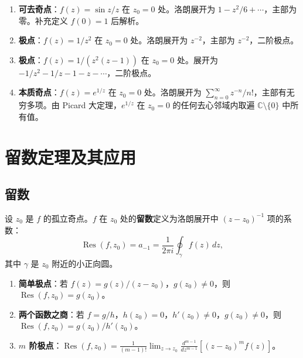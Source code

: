 \begin{example}[三类孤立奇点的实例]\label{ex:ca_singularity_examples}
\begin{enumerate}[label=(\roman*)]
    \item \textbf{可去奇点}：$f(z) = \sin z / z$ 在 $z_0 = 0$ 处。洛朗展开为 $1 - z^2/6 + \cdots$，主部为零。补充定义 $f(0) = 1$ 后解析。
    \item \textbf{极点}：$f(z) = 1/z^2$ 在 $z_0 = 0$ 处。洛朗展开为 $z^{-2}$，主部为 $z^{-2}$，二阶极点。
    \item \textbf{极点}：$f(z) = 1/(z^2(z-1))$ 在 $z_0 = 0$ 处。展开为 $-1/z^2 - 1/z - 1 - z - \cdots$，二阶极点。
    \item \textbf{本质奇点}：$f(z) = e^{1/z}$ 在 $z_0 = 0$ 处。洛朗展开为 $\sum_{n=0}^{\infty} z^{-n}/n!$，主部有无穷多项。由 Picard 大定理，$e^{1/z}$ 在 $z_0 = 0$ 的任何去心邻域内取遍 $\mathbb{C} \setminus \{0\}$ 中所有值。
\end{enumerate}
\end{example}

\section{留数定理及其应用}

\subsection{留数}

\begin{definition}[留数]\label{def:ca_residue}
设 $z_0$ 是 $f$ 的孤立奇点。$f$ 在 $z_0$ 处的\textbf{留数}定义为洛朗展开中 $(z - z_0)^{-1}$ 项的系数：
\[
\operatorname{Res}(f, z_0) = a_{-1} = \frac{1}{2\pi i} \oint_\gamma f(z) \, dz,
\]
其中 $\gamma$ 是 $z_0$ 附近的小正向圆。
\end{definition}

\begin{proposition}[留数的计算]\label{prop:ca_residue_calculation}
\begin{enumerate}[label=(\roman*)]
    \item \textbf{简单极点}：若 $f(z) = g(z)/(z - z_0)$，$g(z_0) \neq 0$，则 $\operatorname{Res}(f, z_0) = g(z_0)$。
    \item \textbf{两个函数之商}：若 $f = g/h$，$h(z_0) = 0$，$h'(z_0) \neq 0$，$g(z_0) \neq 0$，则 $\operatorname{Res}(f, z_0) = g(z_0)/h'(z_0)$。
    \item \textbf{$m$ 阶极点}：$\operatorname{Res}(f, z_0) = \frac{1}{(m-1)!} \lim_{z \to z_0} \frac{d^{m-1}}{dz^{m-1}} [(z - z_0)^m f(z)]$。
\end{enumerate}
\end{proposition}

